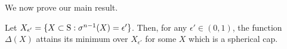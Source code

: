 

%
%

We now prove our main result.
\begin{theorem}Let $X_{\epsilon'} = \{X \subset \text{S}: \sigma^{n-1}(X) = \epsilon'\}$. Then, for any $\epsilon' \in (0,1)$, the function $\Delta(X)$ attains its minimum over $X_{\epsilon'}$ for some $X$ which is a spherical cap.
\end{theorem}

